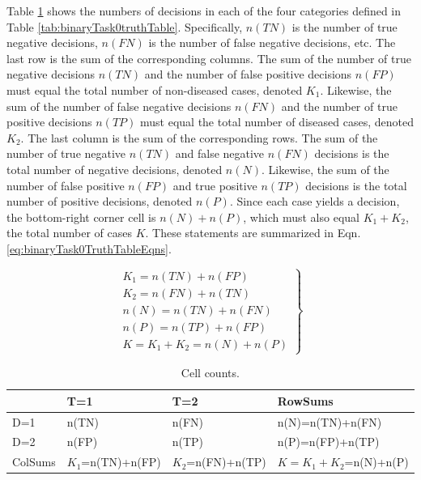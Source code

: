 \documentclass[
]{book}
\begin{document}
Table \ref{tab:binaryTask0truthTable2} shows the numbers of decisions in each of the four categories defined in Table \ref{tab:binaryTask0truthTable}. Specifically, \(n(TN)\) is the number of true negative decisions, \(n(FN)\) is the number of false negative decisions, etc. The last row is the sum of the corresponding columns. The sum of the number of true negative decisions \(n(TN)\) and the number of false positive decisions \(n(FP)\) must equal the total number of non-diseased cases, denoted \(K_1\). Likewise, the sum of the number of false negative decisions \(n(FN)\) and the number of true positive decisions \(n(TP)\) must equal the total number of diseased cases, denoted \(K_2\). The last column is the sum of the corresponding rows. The sum of the number of true negative \(n(TN)\) and false negative \(n(FN)\) decisions is the total number of negative decisions, denoted \(n(N)\). Likewise, the sum of the number of false positive \(n(FP)\) and true positive \(n(TP)\) decisions is the total number of positive decisions, denoted \(n(P)\). Since each case yields a decision, the bottom-right corner cell is \(n(N) + n(P)\), which must also equal \(K_1+K_2\), the total number of cases \(K\). These statements are summarized in Eqn. \eqref{eq:binaryTask0TruthTableEqns}.

\begin{equation} 
\left.\begin{matrix}
K_1=n(TN)+n(FP)\\ 
K_2=n(FN)+n(TN)\\ 
n(N)=n(TN)+n(FN)\\ 
n(P)=n(TP)+n(FP)\\
K=K_1+K_2=n(N)+n(P)
\end{matrix}\right\}
\label{eq:binaryTask0TruthTableEqns}
\end{equation}

\begin{table}

\caption{\label{tab:binaryTask0truthTable2}Cell counts.}
\centering
\begin{tabular}[t]{l|l|l|l}
\hline
  & T=1 & T=2 & RowSums\\
\hline
D=1 & n(TN) & n(FN) & n(N)=n(TN)+n(FN)\\
\hline
D=2 & n(FP) & n(TP) & n(P)=n(FP)+n(TP)\\
\hline
ColSums & $K_1$=n(TN)+n(FP) & $K_2$=n(FN)+n(TP) & $K=K_1+K_2$=n(N)+n(P)\\
\hline
\end{tabular}
\end{table}
\end{document}
